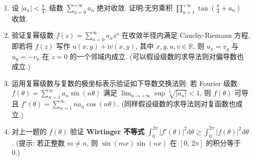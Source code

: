 \begin{enumerate}
    \item[4.]设 \(\displaystyle |a_{n}|< \frac{\pi}{4}\), 级数 \(\displaystyle\sum_{n = 0}^{+\infty}a_{n}\) 绝对收敛. 证明:无穷乘积 \(\displaystyle\prod_{n = 1}^{+\infty}\tan \left(\frac{\pi}{4} +a_{n}\right)\) 收敛.
    \item[5.]验证复幂级数 \(\displaystyle f(z) = \sum_{n = 0}^{\infty}a_{n}z^{n}\) 在收敛半径内满足 Cauchy-Riemann 方程, 
    即若将 \(f(z)\) 写作 \(\displaystyle u(x,y) + \mathrm{i}v(x,y)\), 其中 \(x,y,u,v\in \mathbb{R}\), 则 \(\displaystyle u_{x} = v_{y}\) 与 \(\displaystyle u_{y} = -v_{x}\) 在 \(z = 0\) 的一个邻域内成立. 
    (可以假设级数的求导法则对偏导数也成立.)
    \item[6.]运用复幂级数与复数的极坐标表示验证如下导数交换法则: 若 Fourier 级数 \(\displaystyle f(\theta) = \sum_{n = 1}^{\infty}a_{n}\sin (n\theta)\) 满足 \(\displaystyle \lim_{n\to +\infty}\sup \sqrt[n]{|a_{n}|} < 1\), 
    则 \(f(\theta)\) 可导且 \(\displaystyle f'(\theta) = \sum_{n = 1}^{\infty}na_{n}\cos (n\theta)\). 
    (同样假设级数的求导法则对复函数也成立.)
    \item[7.]对上一题的 \(f(\theta)\) 验证 \textbf{Wirtinger 不等式} \(\displaystyle \int_{0}^{2\pi}|f'(\theta)|^{2}\mathrm{d}\theta \geq \int_{0}^{2\pi}|f(\theta)|^{2}\mathrm{d}\theta\). 
    (提示: 若正整数 \(m\neq n\), 则 \(\displaystyle \sin (mx)\sin (nx)\) 在 $[0,\,2\pi]$ 的积分等于 0.)
\end{enumerate}